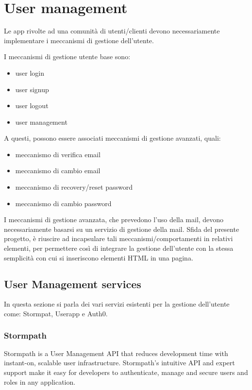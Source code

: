 \section{User management}
\label{sec:USR_user_management}

Le app rivolte ad una comunità di utenti/clienti devono necessariamente implementare i meccanismi di gestione dell'utente.

I meccanismi di gestione utente base sono:
\begin{itemize}
\item user login 
\item user signup
\item user logout
\item user management
\end{itemize}

A questi, possono essere associati meccanismi di gestione avanzati, quali:
\begin{itemize}
\item meccanismo di verifica email
\item meccanismo di cambio email
\item meccanismo di recovery/reset password
\item meccanismo di cambio password
\end{itemize}

I meccanismi di gestione avanzata, che prevedono l'uso della mail, devono necessariamente basarsi su un servizio di gestione della mail.
Sfida del presente progetto, è riuscire ad incapsulare tali meccanismi/comportamenti in relativi elementi, per permettere così di integrare la gestione dell'utente con la stessa semplicità con cui si inseriscono elementi HTML in una pagina.


\subsection{User Management services}
\label{subsec:USR_user_management_services}
In questa sezione si parla dei vari servizi esistenti per la gestione dell'utente come: Stormpat, Userapp e Auth0.

\subsubsection{Stormpath}

Stormpath is a User Management API that reduces development time with instant-on, scalable user infrastructure. Stormpath's intuitive API and expert support make it easy for developers to authenticate, manage and secure users and roles in any application.

